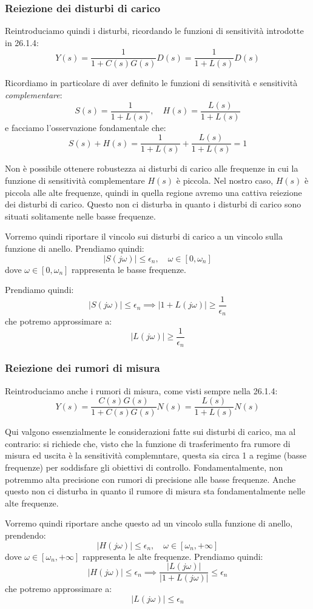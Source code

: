 \documentclass[a4paper,11pt]{article}
\begin{document}
\subsubsection{Reiezione dei disturbi di carico}

Reintroduciamo quindi i disturbi, ricordando le funzioni di sensitività introdotte in 26.1.4:
$$
Y(s) = \frac{1}{1 + C(s)G(s)}D(s) = \frac{1}{1 + L(s)} D(s)
$$

Ricordiamo in particolare di aver definito le funzioni di sensitività e sensitività \textit{complementare}:
$$
S(s) = \frac{1}{1 + L(s)}, \quad H(s) = \frac{L(s)}{1 + L(s)}
$$
e facciamo l'osservazione fondamentale che:
$$
S(s) + H(s) = \frac{1}{1 + L(s)} + \frac{L(s)}{1 + L(s)} = 1
$$

Non è possibile ottenere robustezza ai disturbi di carico alle frequenze in cui la funzione di sensitività complementare $H(s)$ è piccola.
Nel nostro caso, $H(s)$ è piccola alle alte frequenze, quindi in quella regione avremo una cattiva reiezione dei disturbi di carico.
Questo non ci disturba in quanto i disturbi di carico sono situati solitamente nelle basse frequenze.

Vorremo quindi riportare il vincolo sui disturbi di carico a un vincolo sulla funzione di anello.
Prendiamo quindi:
$$
|S(j\omega)| \leq \epsilon_n, \quad \omega \in [0, \omega_n]
$$
dove $\omega \in [0, \omega_n]$ rappresenta le basse frequenze.

Prendiamo quindi: 
$$
|S(j\omega)| \leq \epsilon_n \implies |1 + L(j\omega)| \geq \frac{1}{\epsilon_n}
$$
che potremo approssimare a:
$$
|L(j\omega)| \geq \frac{1}{\epsilon_n}
$$

\subsubsection{Reiezione dei rumori di misura}
Reintroduciamo anche i rumori di misura, come visti sempre nella 26.1.4:
$$
Y(s) = \frac{C(s)G(s)}{1 + C(s) G(s)} N(s) = \frac{L(s)}{1 + L(s)} N(s)
$$

Qui valgono essenzialmente le considerazioni fatte sui disturbi di carico, ma al contrario: si richiede che, visto che la funzione di trasferimento fra rumore di misura ed uscita è la sensitività complemntare, questa sia circa 1 a regime (basse frequenze) per soddisfare gli obiettivi di controllo.
Fondamentalmente, non potremmo alta precisione con rumori di precisione alle basse frequenze.
Anche questo non ci disturba in quanto il rumore di misura sta fondamentalmente nelle alte frequenze.

Vorremo quindi riportare anche questo ad un vincolo sulla funzione di anello, prendendo:
$$
|H(j\omega)| \leq \epsilon_n, \quad \omega \in [\omega_n, +\infty]
$$
dove $\omega \in [\omega_n, +\infty]$ rappresenta le alte frequenze.
Prendiamo quindi:
$$
|H(j\omega)| \leq \epsilon_n \implies \frac{|L(j\omega)|}{|1 + L(j\omega)|} \leq \epsilon_n
$$
che potremo approssimare a:
$$
|L(j\omega)| \leq \epsilon_n
$$
\end{document}
